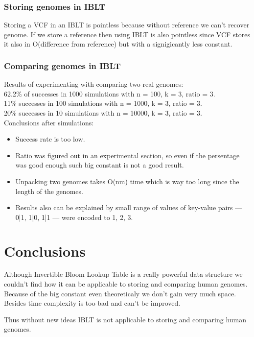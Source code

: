 \documentclass{article}
\begin{document}
\subsubsection{Storing genomes in IBLT}
Storing a VCF in an IBLT is pointless because without reference we can't recover
genome. If we store a reference then using IBLT is also pointless since VCF stores 
it also in O(difference from reference) but with a signigicantly less constant.
\subsubsection{Comparing genomes in IBLT}
Results of experimenting with comparing two real genomes: \\
62.2\% of successes in 1000 simulations with n = 100, k = 3, ratio = 3. \\
11\% successes in 100 simulations with n = 1000, k = 3, ratio = 3. \\
20\% successes in 10 simulations with n = 10000, k = 3, ratio = 3. \\

Conclusions after simulations:
\begin{itemize}
    \item Success rate is too low.
    \item Ratio was figured out in an experimental section, so even if 
the persentage was good enough such big constant is not a good result.
    \item Unpacking two genomes takes O(nm) time which is way too long since the
        length of the genomes. 
    \item Results also can be explained by small range of values of key-value 
        pairs --- 0|1, 1|0, 1|1 --- were encoded to 1, 2, 3.
\end{itemize}


\section{Conclusions}
Although Invertible Bloom Lookup Table is a really powerful data structure we 
couldn't find how it can be applicable to storing and comparing human genomes. 
Because of the big constant even theoreticaly we don't gain very much space. 
Besides time complexity is too bad and can't be improved. 

Thus without new ideas IBLT is not applicable to storing and comparing human genomes.
\end{document}
